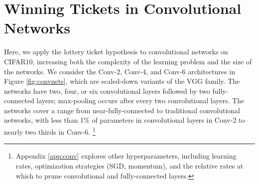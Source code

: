 \section{Winning Tickets in Convolutional Networks}
\label{sec:conv}

Here, we apply the lottery ticket hypothesis to convolutional networks on CIFAR10,
increasing both the complexity of the learning problem and the size of the networks.
We consider the Conv-2, Conv-4, and Conv-6 architectures in Figure \ref{fig:convnets}, which are scaled-down variants
of the VGG \citep{vgg} family. The networks have two, four, or six convolutional layers followed by
two fully-connected layers; max-pooling occurs after every two convolutional layers. The networks cover a range from near-fully-connected to
traditional convolutional networks, with less than 1\% of parameters
in convolutional layers in Conv-2 to nearly two thirds in Conv-6.%
\footnote{Appendix \ref{app:conv} explores other hyperparameters, including learning rates, optimization strategies (SGD, momentum),
and the relative rates at which to prune convolutional and fully-connected layers.}


